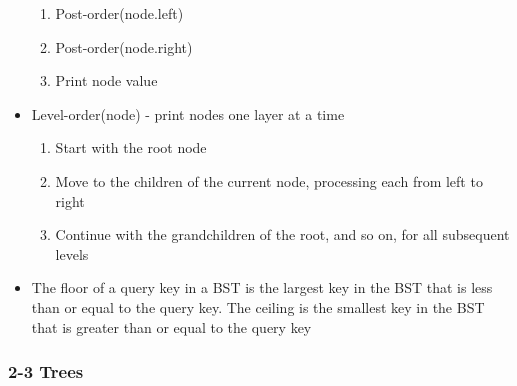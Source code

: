 \documentclass{article}
\begin{document}
\begin{itemize}
\begin{enumerate}
        \item Post-order(node.left)
        \item Post-order(node.right)
        \item Print node value
    \end{enumerate}
    \item Level-order(node) - print nodes one layer at a time
    \begin{enumerate}
        \item Start with the root node
        \item Move to the children of the current node, processing each from left to right
        \item Continue with the grandchildren of the root, and so on, for all subsequent levels
    \end{enumerate}
    \item The floor of a query key in a BST is the largest key in the BST that is less than or equal to the query key. The ceiling is the smallest key in the BST that is greater than or equal to the query key
\end{itemize}

\subsubsection{2-3 Trees}
\end{document}
